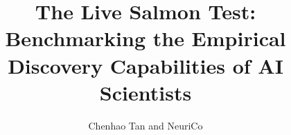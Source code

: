 \documentclass{article}
\author{Chenhao Tan and NeuriCo}
\title{The Live Salmon Test: Benchmarking the Empirical Discovery Capabilities of AI Scientists}
\begin{document}
\maketitle

\begin{abstract}

\end{abstract}









\end{document}
